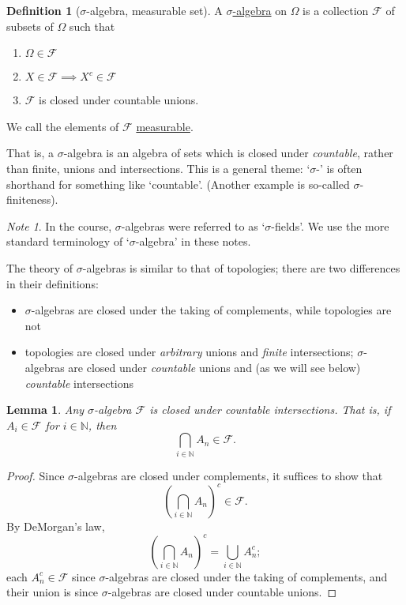 \documentclass[a4paper]{scrartcl}
\newcommand{\N}{\mathbb{N}}
\newcommand{\defn}[1]{\ul{#1}}
\theoremstyle{definition}
\newtheorem{definition}{Definition}[section]
\theoremstyle{plain}
\newtheorem{lemma}{Lemma}[section]
\theoremstyle{remark}
\newtheorem{note}{Note}[section]
\begin{document}
\begin{definition}[$\sigma$-algebra, measurable set]
  \label{def:sigmaalgebra}
  A \defn{$\sigma$-algebra} on $\Omega$ is a collection $\mathcal{F}$ of subsets of $\Omega$ such that
  \begin{enumerate}
    \item $\Omega \in \mathcal{F}$
    \item $X \in \mathcal{F} \implies X^{c} \in \mathcal{F}$
    \item $\mathcal{F}$ is closed under countable unions.
  \end{enumerate}

  We call the elements of $\mathcal{F}$ \defn{measurable}.
\end{definition}

That is, a $\sigma$-algebra is an algebra of sets which is closed under \emph{countable}, rather than finite, unions and intersections. This is a general theme: `$\sigma$-' is often shorthand for something like `countable'. (Another example is so-called $\sigma$-finiteness).

\begin{note}
  In the course, $\sigma$-algebras were referred to as `$\sigma$-fields'. We use the more standard terminology of `$\sigma$-algebra' in these notes.
\end{note}

The theory of $\sigma$-algebras is similar to that of topologies; there are two differences in their definitions:
\begin{itemize}
  \item $\sigma$-algebras are closed under the taking of complements, while topologies are not

  \item topologies are closed under \emph{arbitrary} unions and \emph{finite} intersections; $\sigma$-algebras are closed under \emph{countable} unions and (as we will see below) \emph{countable} intersections
\end{itemize}

\begin{lemma}
  \label{lemma:sigmaalgebrasclosedundercountableintersections}
  Any $\sigma$-algebra $\mathcal{F}$ is closed under countable intersections. That is, if $A_{i} \in \mathcal{F}$ for $i \in \N$, then
  \begin{equation*}
    \bigcap_{i \in \N} A_{n} \in \mathcal{F}.
  \end{equation*}
\end{lemma}
\begin{proof}
  Since $\sigma$-algebras are closed under complements, it suffices to show that
  \begin{equation*}
    {\left( \bigcap_{i \in \N} A_{n} \right)}^{c} \in \mathcal{F}.
  \end{equation*}
  By DeMorgan's law,
  \begin{equation*}
    {\left( \bigcap_{i \in \N} A_{n} \right)}^{c} = \bigcup_{i \in \N} A^{c}_{n};
  \end{equation*}
  each $A^{c}_{n} \in \mathcal{F}$ since $\sigma$-algebras are closed under the taking of complements, and their union is since $\sigma$-algebras are closed under countable unions.
\end{proof}
\end{document}

